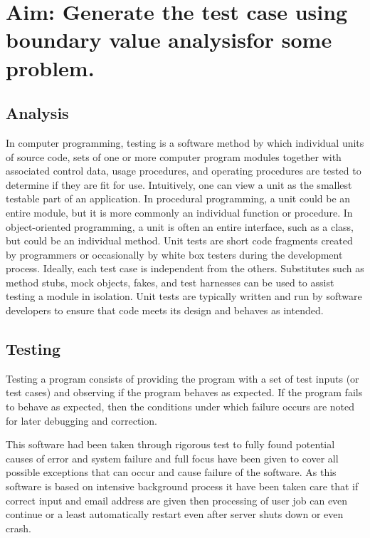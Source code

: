 \section*{\fontsize{16}{14}\selectfont Aim: Generate the test case using boundary value analysisfor some problem.}
\subsection*{Analysis}
In computer programming, testing is a software method by which
individual units of source code, sets of one or more computer program
modules together with associated control data, usage procedures, and
operating procedures are tested to determine if they are fit for use.
Intuitively, one can view a unit as the smallest testable part of an
application. In procedural programming, a unit could be an entire
module, but it is more commonly an individual function or procedure.
In object-oriented programming, a unit is often an entire interface,
such as a class, but could be an individual method. Unit tests are
short code fragments created by programmers or occasionally by white
box testers during the development process. Ideally, each test case is
independent from the others. Substitutes such as method stubs, mock
objects, fakes, and test harnesses can be used to assist testing a
module in isolation. Unit tests are typically written and run by
software developers to ensure that code meets its design and behaves
as intended.

\subsection*{Testing}

Testing a program consists of providing the program with a set of test inputs (or test cases) and
observing if the program behaves as expected. If the program fails to behave as expected, then the
conditions under which failure occurs are noted for later debugging and correction. 


This software had been taken through rigorous test to fully found potential causes of error and system failure
and full focus have been given to cover all possible exceptions that can 
occur and cause failure of the software.
As this software is based on intensive background process it have been taken care that 
if correct input and email address are given then processing of user job can even continue or a least automatically 
restart even after server shuts down or even crash.


